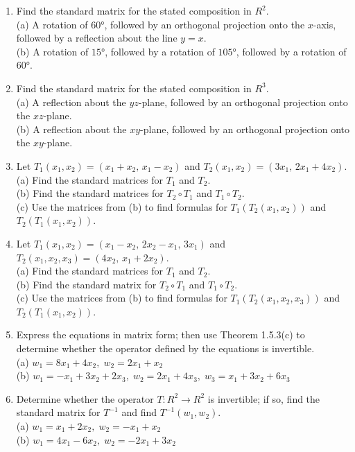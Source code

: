 \documentclass{article}
\theoremstyle{mystyle}
\begin{document}
\begin{enumerate}
\item[8.] Find the standard matrix for the stated composition in $R^2$.\\
(a) A rotation of $60°$, followed by an orthogonal projection onto the $x$-axis, followed by a reflection about the line $y=x$.\\
(b) A rotation of $15°$, followed by a rotation of $105°$, followed by a rotation of $60°$.

\item[9.] Find the standard matrix for the stated composition in $R^3$.\\
(a) A reflection about the $yz$-plane, followed by an orthogonal projection onto the $xz$-plane.\\
(b) A reflection about the $xy$-plane, followed by an orthogonal projection onto the $xy$-plane.

\item[11.] Let $T_1(x_1,x_2)=(x_1+x_2,\,x_1-x_2)$ and $T_2(x_1,x_2)=(3x_1,\,2x_1+4x_2)$.\\
(a) Find the standard matrices for $T_1$ and $T_2$.\\
(b) Find the standard matrices for $T_2\circ T_1$ and $T_1\circ T_2$.\\
(c) Use the matrices from (b) to find formulas for $T_1(T_2(x_1,x_2))$ and $T_2(T_1(x_1,x_2))$.

\item[13.] Let $T_1(x_1,x_2)=(x_1-x_2,\,2x_2-x_1,\,3x_1)$ and $T_2(x_1,x_2,x_3)=(4x_2,\,x_1+2x_2)$.\\
(a) Find the standard matrices for $T_1$ and $T_2$.\\
(b) Find the standard matrix for $T_2\circ T_1$ and $T_1\circ T_2$.\\
(c) Use the matrices from (b) to find formulas for $T_1(T_2(x_1,x_2,x_3))$ and $T_2(T_1(x_1,x_2))$.

\item[17.] Express the equations in matrix form; then use Theorem 1.5.3(c) to determine whether the operator defined by the equations is invertible.\\
(a) $w_1=8x_1+4x_2,\; w_2=2x_1+x_2$\\
(b) $w_1=-x_1+3x_2+2x_3,\; w_2=2x_1+4x_3,\; w_3=x_1+3x_2+6x_3$

\item[19.] Determine whether the operator $T:R^2\to R^2$ is invertible; if so, find the standard matrix for $T^{-1}$ and find $T^{-1}(w_1,w_2)$.\\
(a) $w_1=x_1+2x_2,\; w_2=-x_1+x_2$\\
(b) $w_1=4x_1-6x_2,\; w_2=-2x_1+3x_2$


\end{enumerate}
\end{document}
